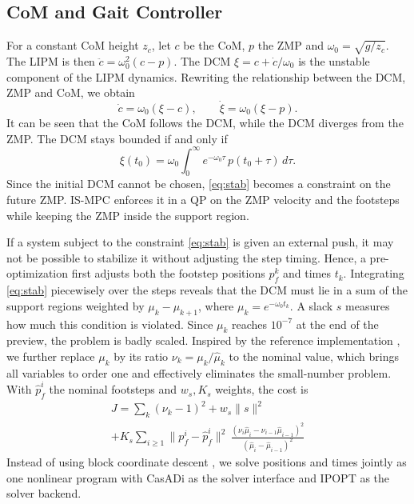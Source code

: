 \documentclass[conference]{IEEEtran}
\begin{document}
\subsection{CoM and Gait Controller}
For a constant CoM height $z_c$, let $c$ be the CoM, $p$ the ZMP and $\omega_0=\sqrt{g/z_c}$.
The LIPM is then $\ddot c=\omega_0^2(c-p)$.
The DCM $\xi=c+\dot c/\omega_0$ is the unstable component of the LIPM dynamics. Rewriting the relationship between the DCM, ZMP and CoM, we obtain
\begin{equation}
\dot c=\omega_0(\xi-c),\qquad \dot\xi=\omega_0(\xi-p).
\label{eq:dcm}
\end{equation}
It can be seen that the CoM follows the DCM, while the DCM diverges from the ZMP.
The DCM stays bounded if and only if \cite{lanari2014boundedness}
\begin{equation}
\xi(t_0)=\omega_0\int_{0}^{\infty}e^{-\omega_0\tau}\,p(t_0+\tau)\,d\tau .
\label{eq:stab}
\end{equation}
Since the initial DCM cannot be chosen, \eqref{eq:stab} becomes a constraint on the future ZMP.
IS-MPC \cite{scianca2020ismpc} enforces it in a QP on the ZMP velocity and the footsteps while keeping the ZMP inside the support region.

If a system subject to the constraint \eqref{eq:stab} is given an external push, it may not be possible to stabilize it without adjusting the step timing. Hence, a pre-optimization \cite{dallard2025adios} first adjusts both the footstep positions $p_f^k$ and times $t_k$.
Integrating \eqref{eq:stab} piecewisely over the steps reveals that the DCM must lie in a sum of the support regions weighted by $\mu_k-\mu_{k+1}$, where $\mu_k=e^{-\omega_0 t_k}$.
A slack $s$ measures how much this condition is violated.
Since $\mu_k$ reaches $10^{-7}$ at the end of the preview, the problem is badly scaled.
Inspired by the reference implementation \cite{mc_ismpcwalking}, we further replace $\mu_k$ by its ratio $\nu_k=\mu_k/\hat\mu_k$ to the nominal value, which brings all variables to order one and effectively eliminates the small-number problem.
With $\hat p_f^i$ the nominal footsteps and $w_s,K_s$ weights, the cost is
\begin{multline}
J=\sum_k(\nu_k-1)^2+w_s\|s\|^2\\
+K_s\sum_{i\ge1}\big\|p_f^i-\hat p_f^i\big\|^2\,
\frac{(\nu_i\hat\mu_i-\nu_{i-1}\hat\mu_{i-1})^2}{(\hat\mu_i-\hat\mu_{i-1})^2}
\label{eq:cost}
\end{multline}
Instead of using block coordinate descent \cite{tseng2001bcd,wright2015coordinate,dallard2025adios}, we solve positions and times jointly as one nonlinear program with CasADi \cite{andersson2019casadi} as the solver interface and IPOPT \cite{wachter2006ipopt} as the solver backend.
\end{document}
